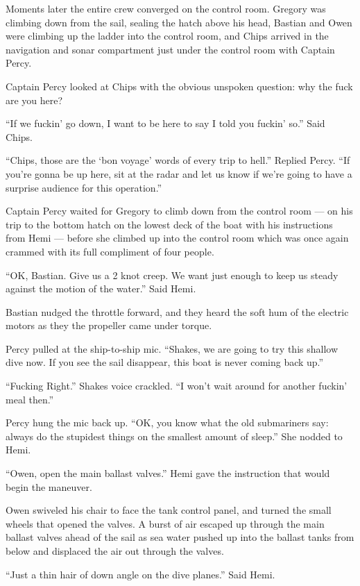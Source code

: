 \documentclass[
]{scrbook}
\begin{document}
Moments later the entire crew converged on the control room. Gregory was
climbing down from the sail, sealing the hatch above his head, Bastian
and Owen were climbing up the ladder into the control room, and Chips
arrived in the navigation and sonar compartment just under the control
room with Captain Percy.

Captain Percy looked at Chips with the obvious unspoken question: why
the fuck are you here?

``If we fuckin' go down, I want to be here to say I told you fuckin'
so.'' Said Chips.

``Chips, those are the `bon voyage' words of every trip to hell.''
Replied Percy. ``If you're gonna be up here, sit at the radar and let us
know if we're going to have a surprise audience for this operation.''

Captain Percy waited for Gregory to climb down from the control room ---
on his trip to the bottom hatch on the lowest deck of the boat with his
instructions from Hemi --- before she climbed up into the control room
which was once again crammed with its full compliment of four people.

``OK, Bastian. Give us a 2 knot creep. We want just enough to keep us
steady against the motion of the water.'' Said Hemi.

Bastian nudged the throttle forward, and they heard the soft hum of the
electric motors as they the propeller came under torque.

Percy pulled at the ship-to-ship mic. ``Shakes, we are going to try this
shallow dive now. If you see the sail disappear, this boat is never
coming back up.''

``Fucking Right.'' Shakes voice crackled. ``I won't wait around for
another fuckin' meal then.''

Percy hung the mic back up. ``OK, you know what the old submariners say:
always do the stupidest things on the smallest amount of sleep.'' She
nodded to Hemi.

``Owen, open the main ballast valves.'' Hemi gave the instruction that
would begin the maneuver.

Owen swiveled his chair to face the tank control panel, and turned the
small wheels that opened the valves. A burst of air escaped up through
the main ballast valves ahead of the sail as sea water pushed up into
the ballast tanks from below and displaced the air out through the
valves.

``Just a thin hair of down angle on the dive planes.'' Said Hemi.
\end{document}

